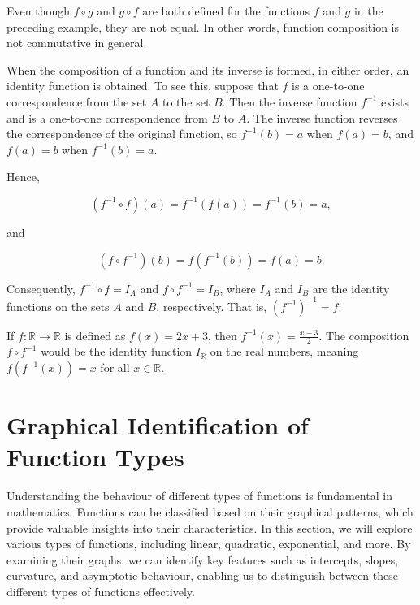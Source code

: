 \begin{remark}
Even though \( f \circ g \) and \( g \circ f \) are both defined for the functions \( f \) and \( g \) in the preceding example, they are not equal. In other words, function composition is not commutative in general.
  
\end{remark}

When the composition of a function and its inverse is formed, in either order, an identity function is obtained. To see this, suppose that \( f \) is a one-to-one correspondence from the set \( A \) to the set \( B \). Then the inverse function \( f^{-1} \) exists and is a one-to-one correspondence from \( B \) to \( A \). The inverse function reverses the correspondence of the original function, so \( f^{-1}(b)=a \) when \( f(a)=b \), and \( f(a)=b \) when \( f^{-1}(b)=a \).

Hence,

\[
\left(f^{-1} \circ f\right)(a) = f^{-1}(f(a)) = f^{-1}(b) = a,
\]

and

\[
\left(f \circ f^{-1}\right)(b) = f\left(f^{-1}(b)\right) = f(a) = b.
\]

Consequently, \( f^{-1} \circ f = I_A \) and \( f \circ f^{-1} = I_B \), where \( I_A \) and \( I_B \) are the identity functions on the sets \( A \) and \( B \), respectively. That is, \( \left(f^{-1}\right)^{-1} = f \).

\begin{example}
    If $f: \mathbb{R} \rightarrow \mathbb{R}$ is defined as $f(x)=2 x+3$, then $f^{-1}(x)=\frac{x-3}{2}$. The composition $f \circ f^{-1}$ would be the identity function $I_{\mathbb{R}}$ on the real numbers, meaning $f\left(f^{-1}(x)\right)=x$ for all $x \in \mathbb{R}$.
\end{example}

\section{Graphical Identification of Function Types}
Understanding the behaviour of different types of functions is fundamental in mathematics. Functions can be classified based on their graphical patterns, which provide valuable insights into their characteristics. In this section, we will explore various types of functions, including linear, quadratic, exponential, and more. By examining their graphs, we can identify key features such as intercepts, slopes, curvature, and asymptotic behaviour, enabling us to distinguish between these different types of functions effectively.


